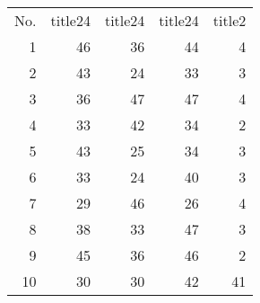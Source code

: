 \begin{tabular}{rrrrr}\toprule 
No.&title24&title24&title24&title2\\
1&46&36&44&4\\
2&43&24&33&3\\
3&36&47&47&4\\
4&33&42&34&2\\
5&43&25&34&3\\
6&33&24&40&3\\
7&29&46&26&4\\
8&38&33&47&3\\
9&45&36&46&2\\
10&30&30&42&41\\
\bottomrule
\end{tabular}
